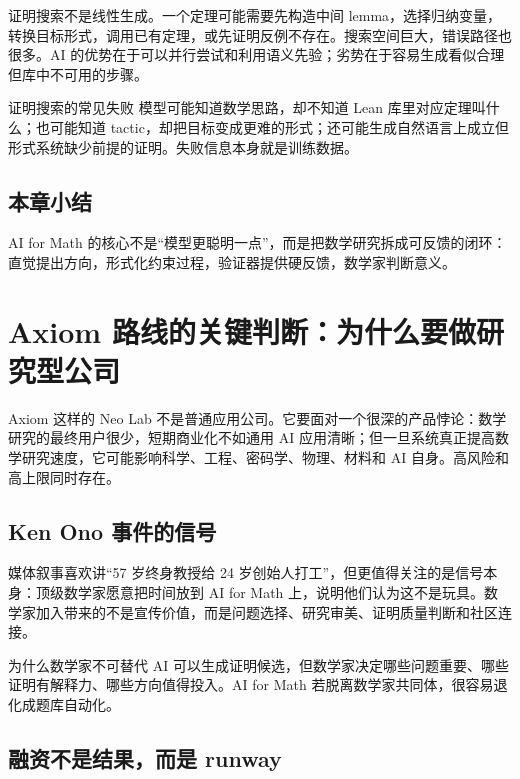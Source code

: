 \documentclass[a4paper]{article}
\begin{document}
证明搜索不是线性生成。一个定理可能需要先构造中间 lemma，选择归纳变量，转换目标形式，调用已有定理，或先证明反例不存在。搜索空间巨大，错误路径也很多。AI 的优势在于可以并行尝试和利用语义先验；劣势在于容易生成看似合理但库中不可用的步骤。

\begin{warningbox}{证明搜索的常见失败}
模型可能知道数学思路，却不知道 Lean 库里对应定理叫什么；也可能知道 tactic，却把目标变成更难的形式；还可能生成自然语言上成立但形式系统缺少前提的证明。失败信息本身就是训练数据。
\end{warningbox}

\subsection{本章小结}

AI for Math 的核心不是“模型更聪明一点”，而是把数学研究拆成可反馈的闭环：直觉提出方向，形式化约束过程，验证器提供硬反馈，数学家判断意义。

\section{Axiom 路线的关键判断：为什么要做研究型公司}

Axiom 这样的 Neo Lab 不是普通应用公司。它要面对一个很深的产品悖论：数学研究的最终用户很少，短期商业化不如通用 AI 应用清晰；但一旦系统真正提高数学研究速度，它可能影响科学、工程、密码学、物理、材料和 AI 自身。高风险和高上限同时存在。

\subsection{Ken Ono 事件的信号}

媒体叙事喜欢讲“57 岁终身教授给 24 岁创始人打工”，但更值得关注的是信号本身：顶级数学家愿意把时间放到 AI for Math 上，说明他们认为这不是玩具。数学家加入带来的不是宣传价值，而是问题选择、研究审美、证明质量判断和社区连接。

\begin{importantbox}{为什么数学家不可替代}
AI 可以生成证明候选，但数学家决定哪些问题重要、哪些证明有解释力、哪些方向值得投入。AI for Math 若脱离数学家共同体，很容易退化成题库自动化。
\end{importantbox}

\subsection{融资不是结果，而是 runway}
\end{document}

